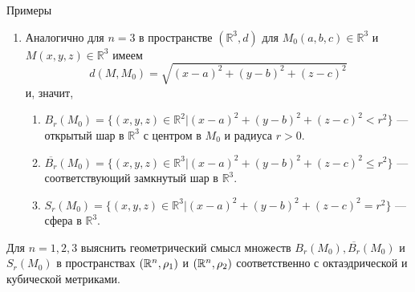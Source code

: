 \begin{statement}{Примеры}
\begin{enumerate}
		\item Аналогично для $n = 3$ в пространстве $(\mathbb{R}^3, d)$ для $M_0 (a, b, c) \in \mathbb{R}^3$ и $M(x, y, z) \in \mathbb{R}^3$ имеем
		\begin{equation*}
		d(M, M_0) = \sqrt{(x-a)^2 + (y-b)^2 + (z-c)^2}
		\end{equation*}
		и, значит,	

		\begin{enumerate}
			\item $B_r (M_0) = \{ (x, y, z) \in \mathbb{R}^2 | (x-a)^2 + (y-b)^2 + (z-c)^2 < r^2 \}$ — открытый шар в $\mathbb{R}^3$ с центром в $M_0$ и радиуса $r > 0$.
			\item $\overline{B_r} (M_0) = \{ (x, y, z) \in \mathbb{R}^3 | (x-a)^2 + (y-b)^2 + (z-c)^2 \leqslant r^2 \}$ — соответствующий замкнутый шар в $\mathbb{R}^3$.
			\item $S_r (M_0) = \{ (x, y, z) \in \mathbb{R}^3 | (x-a)^2 + (y-b)^2 + (z-c)^2 = r^2 \}$ — сфера в $\mathbb{R}^3$.
		\end{enumerate}
	\end{enumerate}
\end{statement}

\begin{exercise}
	Для $n = 1, 2, 3$ выяснить геометрический смысл множеств $B_r(M_0), \overline{B_r}(M_0)$ и $S_r (M_0)$ в пространствах $(\mathbb{R}^n, \rho_1)$ и $(\mathbb{R}^n, \rho_2)$ соответственно с октаэдрической и кубической метриками.
\end{exercise}

